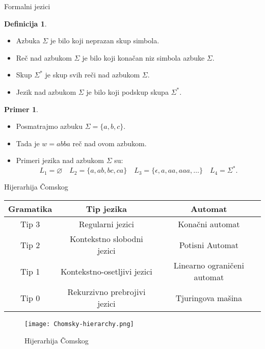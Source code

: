 \documentclass[aspectratio=169, xcolor=table, 10pt]{beamer}
\theoremstyle{definition}
\newtheorem{defi}{Definicija}[section]
\newtheorem{prim}{Primer}[section]
\begin{document}
\begin{frame}{Formalni jezici}

\begin{defi}
    \begin {itemize}
    \item Azbuka $\Sigma$ je bilo koji neprazan skup simbola.
    \item Re\v c nad azbukom $\Sigma$ je bilo koji kona\v can niz simbola azbuke $\Sigma$.
    \item Skup $\Sigma^{*}$ je skup svih re\v ci nad azbukom $\Sigma$.
    \item Jezik nad azbukom $\Sigma$ je bilo koji podskup skupa $\Sigma^{*}$.
    \end {itemize}
\end{defi}

\begin{prim}
    \begin {itemize}
    \item Posmatrajmo azbuku $\Sigma = \{ a, b, c \}$.
    \item Tada je $w = abba$ re\v c nad ovom azbukom.
    \item Primeri jezika nad azbukom $\Sigma$ su: $$L_1 = \varnothing \quad L_2 = \{ a, ab, bc, ca \} \quad L_3 = \{ \epsilon, a, aa, aaa, \dots \} \quad L_4 = \Sigma^{*}.$$
    \end {itemize}
\end{prim}
    
\end{frame}

\begin{frame}{Hijerarhija \v Comskog}

\begin{table}[ht]
\centering
{}
\begin{tabular}{|c|c|c|}
\hline
\textbf{Gramatika} & \textbf{Tip jezika} & \textbf{Automat} \\ 
\hline
Tip 3 & Regularni jezici         & Kona\v cni automat \\ 
\hline
Tip 2 & Kontekstno slobodni jezici & Potisni Automat \\ 
\hline
Tip 1 & Kontekstno-osetljivi jezici & Linearno ograni\v ceni automat\\ 
\hline
\rowcolor{orange} Tip 0 & Rekurzivno prebrojivi jezici & Tjuringova ma\v sina\\ 
\hline
\end{tabular}
\end{table}

\begin{figure}
    \centering
    \texttt{[image: Chomsky-hierarchy.png]}
    \caption{Hijerarhija \v Comskog}
    \label{fig:enter-label}
\end{figure}

\end{frame}
\end{document}
